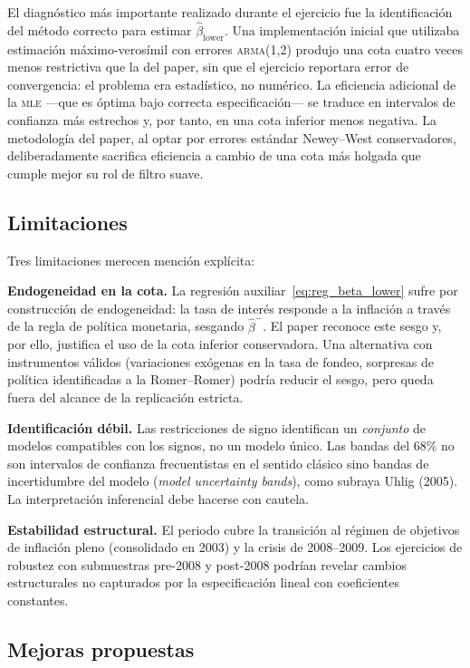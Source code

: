 \documentclass[11pt,letterpaper]{article}
\begin{document}
El diagnóstico más importante realizado durante el ejercicio fue la identificación del método correcto para estimar $\hat\beta_{\text{lower}}$. Una implementación inicial que utilizaba estimación máximo-verosímil con errores \textsc{arma(1,2)} produjo una cota cuatro veces menos restrictiva que la del paper, sin que el ejercicio reportara error de convergencia: el problema era estadístico, no numérico. La eficiencia adicional de la \textsc{mle} —que es óptima bajo correcta especificación— se traduce en intervalos de confianza más estrechos y, por tanto, en una cota inferior menos negativa. La metodología del paper, al optar por errores estándar Newey--West conservadores, deliberadamente sacrifica eficiencia a cambio de una cota más holgada que cumple mejor su rol de filtro suave.

\subsection{Limitaciones}

Tres limitaciones merecen mención explícita:

\textbf{Endogeneidad en la cota.} La regresión auxiliar~\eqref{eq:reg_beta_lower} sufre por construcción de endogeneidad: la tasa de interés responde a la inflación a través de la regla de política monetaria, sesgando $\hat\beta^-$. El paper reconoce este sesgo y, por ello, justifica el uso de la cota inferior conservadora. Una alternativa con instrumentos válidos (variaciones exógenas en la tasa de fondeo, sorpresas de política identificadas a la Romer--Romer) podría reducir el sesgo, pero queda fuera del alcance de la replicación estricta.

\textbf{Identificación débil.} Las restricciones de signo identifican un \textit{conjunto} de modelos compatibles con los signos, no un modelo único. Las bandas del 68\% no son intervalos de confianza frecuentistas en el sentido clásico sino bandas de incertidumbre del modelo (\textit{model uncertainty bands}), como subraya Uhlig (2005). La interpretación inferencial debe hacerse con cautela.

\textbf{Estabilidad estructural.} El periodo cubre la transición al régimen de objetivos de inflación pleno (consolidado en 2003) y la crisis de 2008--2009. Los ejercicios de robustez con submuestras pre-2008 y post-2008 podrían revelar cambios estructurales no capturados por la especificación lineal con coeficientes constantes.

\subsection{Mejoras propuestas}
\end{document}
